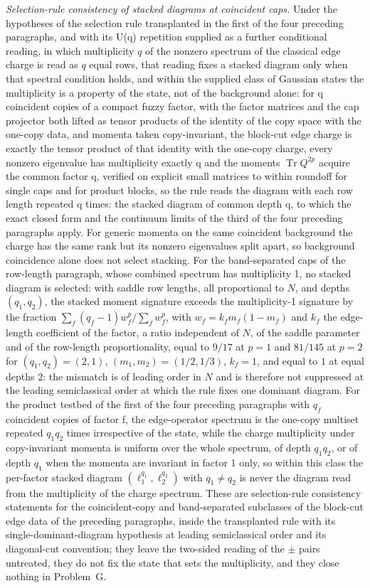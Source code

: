 \emph{Selection-rule consistency of stacked diagrams at coincident caps.} Under the hypotheses of the selection rule transplanted in the first of the four preceding paragraphs, and with its U(q) repetition supplied as a further conditional reading, in which multiplicity \(q\) of the nonzero spectrum of the classical edge charge is read as \(q\) equal rows, that reading fixes a stacked diagram only when that spectral condition holds, and within the supplied class of Gaussian states the multiplicity is a property of the state, not of the background alone: for q coincident copies of a compact fuzzy factor, with the factor matrices and the cap projector both lifted as tensor products of the identity of the copy space with the one-copy data, and momenta taken copy-invariant, the block-cut edge charge is exactly the tensor product of that identity with the one-copy charge, every nonzero eigenvalue has multiplicity exactly q and the moments \(\operatorname{Tr}Q^{2p}\) acquire the common factor q, verified on explicit small matrices to within roundoff for single caps and for product blocks, so the rule reads the diagram with each row length repeated q times: the stacked diagram of common depth q, to which the exact closed form and the continuum limits of the third of the four preceding paragraphs apply. For generic momenta on the same coincident background the charge has the same rank but its nonzero eigenvalues split apart, so background coincidence alone does not select stacking. For the band-separated caps of the row-length paragraph, whose combined spectrum has multiplicity 1, no stacked diagram is selected: with saddle row lengths, all proportional to \(N\), and depths \((q_1,q_2)\), the stacked moment signature exceeds the multiplicity-1 signature by the fraction \(\sum_f(q_f-1)w_f^p/\sum_f w_f^p\), with \(w_f=k_fm_f(1-m_f)\) and \(k_f\) the edge-length coefficient of the factor, a ratio independent of \(N\), of the saddle parameter and of the row-length proportionality, equal to \(9/17\) at \(p=1\) and \(81/145\) at \(p=2\) for \((q_1,q_2)=(2,1)\), \((m_1,m_2)=(1/2,1/3)\), \(k_f=1\), and equal to \(1\) at equal depths \(2\): the mismatch is of leading order in \(N\) and is therefore not suppressed at the leading semiclassical order at which the rule fixes one dominant diagram. For the product testbed of the first of the four preceding paragraphs with \(q_f\) coincident copies of factor f, the edge-operator spectrum is the one-copy multiset repeated \(q_1q_2\) times irrespective of the state, while the charge multiplicity under copy-invariant momenta is uniform over the whole spectrum, of depth \(q_1q_2\), or of depth \(q_1\) when the momenta are invariant in factor 1 only, so within this class the per-factor stacked diagram \((\ell_1^{q_1},\ell_2^{q_2})\) with \(q_1\neq q_2\) is never the diagram read from the multiplicity of the charge spectrum. These are selection-rule consistency statements for the coincident-copy and band-separated subclasses of the block-cut edge data of the preceding paragraphs, inside the transplanted rule with its single-dominant-diagram hypothesis at leading semiclassical order and its diagonal-cut convention; they leave the two-sided reading of the \(\pm\) pairs untreated, they do not fix the state that sets the multiplicity, and they close nothing in Problem~G.

